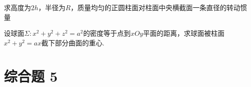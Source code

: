 \begin{xiti}
	\item 求高度为$2h$，半径为$R$，质量均匀的正圆柱面对柱面中央横截面一条直径的转动惯量
	\begin{solution}
	\end{solution}
	
	\item  设球面$\Sigma : x^{2}+y^{2}+z^{2}=a^{2}$的密度等于点到$xOy$平面的距离，求球面被柱面$x^{2}+y^{2}=a x$截下部分曲面的重心.
	\begin{solution}
	\end{solution}
	
\end{xiti}
\section{综合题 5}%
